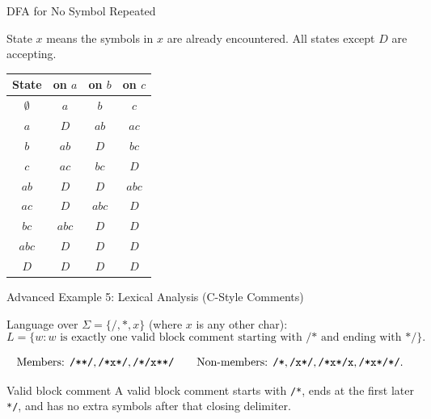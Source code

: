 \documentclass[10pt,aspectratio=169]{beamer}
\begin{document}
\begin{frame}{DFA for No Symbol Repeated}

\small
State $x$ means the symbols in $x$ are already encountered.
All states except $D$ are accepting.

\vspace{0.5em}

\begin{center}
\begin{tabular}{c|ccc}
\toprule
\textbf{State} & \textbf{on $a$} & \textbf{on $b$} & \textbf{on $c$}\\
\midrule
$\emptyset$ & $a$ & $b$ & $c$\\
$a$ & $D$ & ${ab}$ & ${ac}$\\
$b$ & ${ab}$ & $D$ & ${bc}$\\
$c$ & ${ac}$ & ${bc}$ & $D$\\
${ab}$ & $D$ & $D$ & ${abc}$\\
${ac}$ & $D$ & ${abc}$ & $D$\\
${bc}$ & ${abc}$ & $D$ & $D$\\
${abc}$ & $D$ & $D$ & $D$\\
$D$ & $D$ & $D$ & $D$\\
\bottomrule
\end{tabular}
\end{center}

\end{frame}

\begin{frame}{Advanced Example 5: Lexical Analysis (C-Style Comments)}

Language over $\Sigma = \{/, *, x\}$ (where $x$ is any other char):
\[
L=\{w : w\text{ is exactly one valid block comment starting with /* and ending with */} \}.
\]

\[
\text{Members: }\text{\texttt{/**/}},\text{\texttt{/*x*/}},\text{\texttt{/*/x**/}}
\qquad
\text{Non-members: }\text{\texttt{/*}},\text{\texttt{/x*/}},\text{\texttt{/*x*/x}},\text{\texttt{/*x*/*/}}.
\]

\begin{block}{Valid block comment}
A valid block comment starts with \texttt{/*}, ends at the first later \texttt{*/}, and has no extra symbols after that closing delimiter.
\end{block}

\end{frame}
\end{document}
